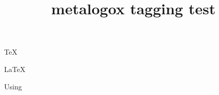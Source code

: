 \documentclass{article}
\title{metalogox tagging test}
\begin{document}
\TeX

\LaTeX

\LaTeXe

\XeTeX

\XeLaTeX

\LuaTeX

\LuaLaTeX

\textsf{Using \autoadjustlogos\LaTeXe}
\end{document}
